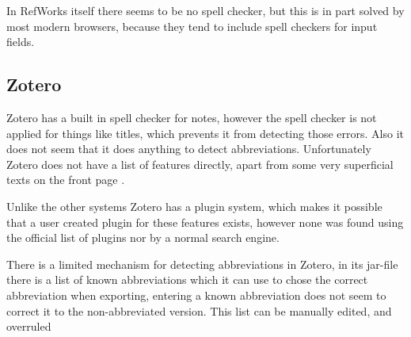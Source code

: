 In RefWorks itself there seems to be no spell checker, but this is in
part solved by most modern browsers, because they tend to include
spell checkers for input fields.

\subsection{Zotero}
Zotero has a built in spell checker for notes, however the spell
checker is not applied for things like titles, which prevents it from
detecting those errors.  Also it does not seem that it does anything
to detect abbreviations.  Unfortunately Zotero does not have a list of
features directly, apart from some very superficial texts on the front
page \cite{zotero_features}.

Unlike the other systems Zotero has a plugin system, which makes it
possible that a user created plugin for these features exists, however
none was found using the official list of plugins
\cite{zotero_plugins} nor by a normal search engine.

There is a limited mechanism for detecting abbreviations in Zotero, in
its jar-file there is a list of known abbreviations which it can use
to chose the correct abbreviation when exporting, entering a known
abbreviation does not seem to correct it to the non-abbreviated
version.  This list can be manually edited, and overruled
\cite{zotero_abbreviations}

